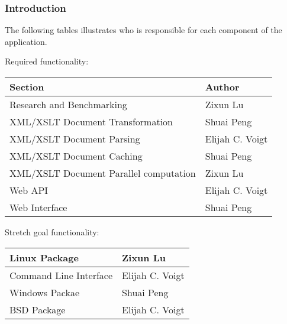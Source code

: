 \subsubsection{Introduction}

The following tables illustrates who is responsible for each component of the application.

Required functionality:

\begin{center}
    \begin{tabular}{ | l | p{10cm} |}
    \hline
    Section & Author \\ \hline
    Research and Benchmarking & Zixun Lu \\ \hline
    XML/XSLT Document Transformation & Shuai Peng \\ \hline
    XML/XSLT Document Parsing & Elijah C. Voigt \\ \hline
    XML/XSLT Document Caching & Shuai Peng \\ \hline
    XML/XSLT Document Parallel computation & Zixun Lu \\ \hline
    Web API & Elijah C. Voigt \\ \hline
    Web Interface & Shuai Peng \\ \hline
    \end{tabular}
\end{center}

Stretch goal functionality:

\begin{center}
    \begin{tabular}{ | l | p{10cm} |}
    \hline
    Linux Package & Zixun Lu \\ \hline
    Command Line Interface& Elijah C. Voigt \\ \hline
    Windows Packae & Shuai Peng \\ \hline
    BSD Package & Elijah C. Voigt \\ \hline
    \end{tabular}
\end{center}

\tableofcontents

\clearpage


\newpage

\printbibliography
